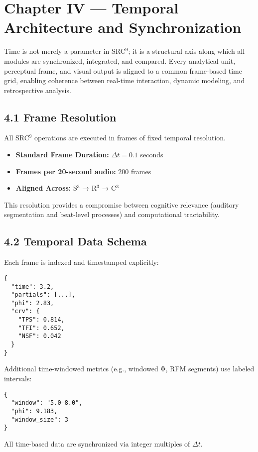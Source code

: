 \section*{Chapter IV — Temporal Architecture and Synchronization}

Time is not merely a parameter in SRC$^{9}$; it is a structural axis along which all modules are synchronized, integrated, and compared. Every analytical unit, perceptual frame, and visual output is aligned to a common frame-based time grid, enabling coherence between real-time interaction, dynamic modeling, and retrospective analysis.

\subsection*{4.1 Frame Resolution}

All SRC$^{9}$ operations are executed in frames of fixed temporal resolution.

\begin{itemize}
  \item \textbf{Standard Frame Duration:} $\Delta t = 0.1$ seconds
  \item \textbf{Frames per 20-second audio:} $200$ frames
  \item \textbf{Aligned Across:} S$^3$ → R$^3$ → C$^3$
\end{itemize}

This resolution provides a compromise between cognitive relevance (auditory segmentation and beat-level processes) and computational tractability.

\subsection*{4.2 Temporal Data Schema}

Each frame is indexed and timestamped explicitly:

\begin{verbatim}
{
  "time": 3.2,
  "partials": [...],
  "phi": 2.83,
  "crv": {
    "TPS": 0.814,
    "TFI": 0.652,
    "NSF": 0.042
  }
}
\end{verbatim}

Additional time-windowed metrics (e.g., windowed Φ, RFM segments) use labeled intervals:

\begin{verbatim}
{
  "window": "5.0–8.0",
  "phi": 9.183,
  "window_size": 3
}
\end{verbatim}

All time-based data are synchronized via integer multiples of $\Delta t$.

